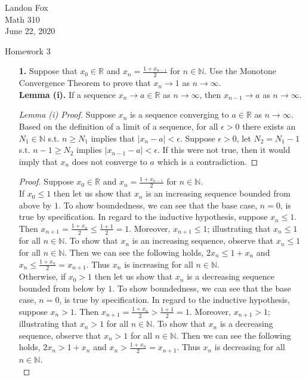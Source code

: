 \documentclass[ 12pt ]{article}
\begin{document}
\noindent Landon Fox \\
\noindent Math 310 \\
\noindent June 22, 2020

\begin{center}
\Large Homework 3
\end{center}

\begin{enumerate}
	\item[\textbf{1.}] Suppose that $x_0 \in \mathbb{R}$ and $x_n = \frac{1+x_{n-1}}{2}$ for $n \in \mathbb{N}$. Use the Monotone Convergence Theorem to prove that
		$x_n \rightarrow 1$ as $n \rightarrow \infty$. \\

	\textbf{Lemma (i).} If a sequence $x_n \rightarrow a \in \mathbb{R}$ as $n \rightarrow \infty$, then $x_{n-1} \rightarrow a$ as $n \rightarrow \infty$.

	\begin{proof}[Lemma (i) Proof]
		Suppose $x_n$ is a sequence converging to $a \in \mathbb{R}$ as $n \rightarrow \infty$. Based on the definition of a limit of a sequence, for all
		$\epsilon > 0$ there exists an $N_1 \in \mathbb{N}$ s.t. $n \geq N_1$ implies that $|x_n - a| < \epsilon$. Suppose $\epsilon > 0$, let $N_2 = N_1 - 1$
		s.t. $n - 1 \geq N_2$ implies $|x_{n-1} - a| < \epsilon$. If this were not true, then it would imply that $x_n$ does not converge to $a$ which is a
		contradiction.
	\end{proof}

	\begin{proof}
		Suppose $x_0 \in \mathbb{R}$ and $x_n = \frac{1+x_{n-1}}{2}$ for $n \in \mathbb{N}$. \\

		If $x_0 \leq 1$ then let us show that $x_n$ is an increasing sequence bounded from above by $1$. To show boundedness, we can see that the base
		case, $n=0$, is true by specification. In regard to the inductive hypothesis, suppose $x_n \leq 1$. Then
		$x_{n+1} = \frac{1 + x_n}{2} \leq \frac{1 + 1}{2} = 1$. Moreover, $x_{n+1} \leq 1$; illustrating that $x_n \leq 1$ for all $n \in \mathbb{N}$. To show
		that $x_n$ is an increasing sequence, observe that $x_n \leq 1$ for all $n \in \mathbb{N}$. Then we can see the following holds, $2x_n \leq 1 + x_n$ and
		$x_n \leq \frac{1 + x_n}{2} = x_{n+1}$. Thus $x_n$ is increasing for all $n \in \mathbb{N}$. \\

		Otherwise, if $x_0 > 1$ then let us show that $x_n$ is a decreasing sequence bounded from below by $1$. To show boundedness, we can see that
		the base case, $n=0$, is true by specification. In regard to the inductive hypothesis, suppose $x_n > 1$. Then
		$x_{n+1} = \frac{1 + x_n}{2} > \frac{1 + 1}{2} = 1$. Moreover, $x_{n+1} > 1$; illustrating that $x_n > 1$ for all $n \in \mathbb{N}$. To show
		that $x_n$ is a decreasing sequence, observe that $x_n > 1$ for all $n \in \mathbb{N}$. Then we can see the following holds, $2x_n > 1 + x_n$ and
		$x_n > \frac{1 + x_n}{2} = x_{n+1}$. Thus $x_n$ is decreasing for all $n \in \mathbb{N}$. \\


\end{proof}
\end{enumerate}
\end{document}
